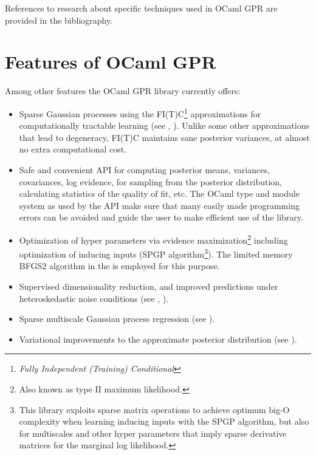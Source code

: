 \documentclass[10pt]{report}
\begin{document}
References to research about specific techniques used in OCaml GPR are provided
in the bibliography.

\section{Features of OCaml GPR}

Among other features the OCaml GPR library currently offers:

\begin{itemize}

\item Sparse Gaussian processes using the FI(T)C\footnote{\emph{Fully
Independent (Training) Conditional}} approximations for computationally
tractable learning (see \cite{conf/nips/2005}, \cite{SnelsonThesis}).  Unlike
some other approximations that lead to degeneracy, FI(T)C maintains sane
posterior variances, at almost no extra computational cost.

\item Safe and convenient API for computing posterior means, variances,
covariances, log evidence, for sampling from the posterior distribution,
calculating statistics of the quality of fit, etc.  The OCaml type and module
system as used by the API make sure that many easily made programming errors can
be avoided and guide the user to make efficient use of the library.

\item Optimization of hyper parameters via evidence maximization\footnote{Also
known as type II maximum likelihood.} including optimization of inducing inputs
(SPGP algorithm\footnote{This library exploits sparse matrix operations to
achieve optimum big-O complexity when learning inducing inputs with the SPGP
algorithm, but also for multiscales and other hyper parameters that imply sparse
derivative matrices for the marginal log likelihood.}).  The limited memory
BFGS2 algorithm in the  is employed for this purpose.

\item Supervised dimensionality reduction, and improved predictions under
heteroskedastic noise conditions (see \cite{conf/uai/SnelsonG06},
\cite{SnelsonThesis}).

\item Sparse multiscale Gaussian process regression (see
\cite{conf/icml/WalderKS08}).

\item Variational improvements to the approximate posterior distribution (see
\cite{Titsias2009}).


\end{itemize}
\end{document}
